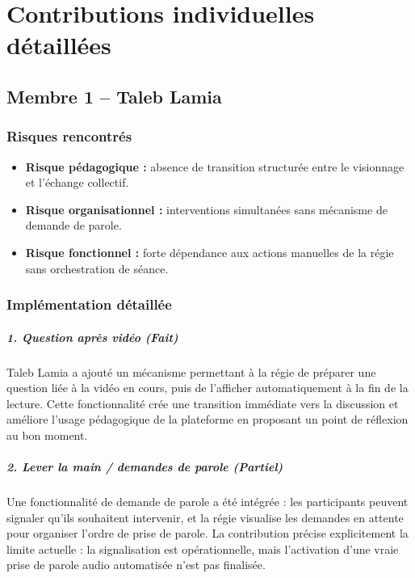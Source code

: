 \documentclass[11pt,a4paper]{report}
\begin{document}
\chapter{Contributions individuelles détaillées}

\section{Membre 1 -- Taleb Lamia}
\subsection{Risques rencontrés}
\begin{itemize}
    \item \textbf{Risque pédagogique :} absence de transition structurée entre le visionnage et l'échange collectif.
    \item \textbf{Risque organisationnel :} interventions simultanées sans mécanisme de demande de parole.
    \item \textbf{Risque fonctionnel :} forte dépendance aux actions manuelles de la régie sans orchestration de séance.
\end{itemize}
\subsection{Implémentation détaillée}
\paragraph{1. Question après vidéo (\textit{Fait})}
Taleb Lamia a ajouté un mécanisme permettant à la régie de préparer une question liée à la vidéo en cours, puis de l'afficher automatiquement à la fin de la lecture. Cette fonctionnalité crée une transition immédiate vers la discussion et améliore l'usage pédagogique de la plateforme en proposant un point de réflexion au bon moment.

\paragraph{2. Lever la main / demandes de parole (\textit{Partiel})}
Une fonctionnalité de demande de parole a été intégrée : les participants peuvent signaler qu'ils souhaitent intervenir, et la régie visualise les demandes en attente pour organiser l'ordre de prise de parole. La contribution précise explicitement la limite actuelle : la signalisation est opérationnelle, mais l'activation d'une vraie prise de parole audio automatisée n'est pas finalisée.
\end{document}
